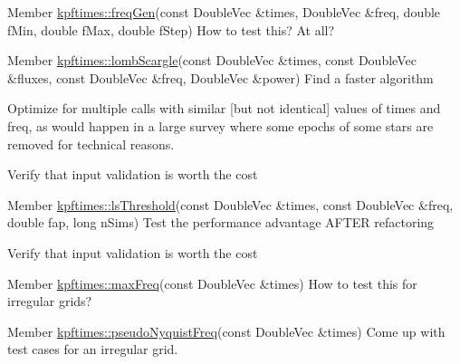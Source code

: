 \label{todo__todo000006}
\hypertarget{todo__todo000006}{}
 
\begin{DoxyDescription}
\item[Member \hyperlink{group__grid_ga5fc61b434afae334b5ec95e1ab0f7093}{kpftimes::freqGen}(const DoubleVec \&times, DoubleVec \&freq, double fMin, double fMax, double fStep) ]How to test this? At all? 
\end{DoxyDescription}

\label{todo__todo000007}
\hypertarget{todo__todo000007}{}
 
\begin{DoxyDescription}
\item[Member \hyperlink{group__period_ga2c64d467f67fa7f90f96617275e057a7}{kpftimes::lombScargle}(const DoubleVec \&times, const DoubleVec \&fluxes, const DoubleVec \&freq, DoubleVec \&power) ]Find a faster algorithm 

Optimize for multiple calls with similar \mbox{[}but not identical\mbox{]} values of times and freq, as would happen in a large survey where some epochs of some stars are removed for technical reasons. 

Verify that input validation is worth the cost 
\end{DoxyDescription}

\label{todo__todo000008}
\hypertarget{todo__todo000008}{}
 
\begin{DoxyDescription}
\item[Member \hyperlink{group__period_ga86b0f84540eab7eb0793b5ba94899d1e}{kpftimes::lsThreshold}(const DoubleVec \&times, const DoubleVec \&freq, double fap, long nSims) ]Test the performance advantage AFTER refactoring 

Verify that input validation is worth the cost 
\end{DoxyDescription}

\label{todo__todo000010}
\hypertarget{todo__todo000010}{}
 
\begin{DoxyDescription}
\item[Member \hyperlink{group__grid_gae62bc6f792fbbc2447cb85dbac341c5f}{kpftimes::maxFreq}(const DoubleVec \&times) ]How to test this for irregular grids? 
\end{DoxyDescription}

\label{todo__todo000009}
\hypertarget{todo__todo000009}{}
 
\begin{DoxyDescription}
\item[Member \hyperlink{group__util_ga4b6ecddd43b6c6caf1d0db59b4a0b613}{kpftimes::pseudoNyquistFreq}(const DoubleVec \&times) ]Come up with test cases for an irregular grid. 
\end{DoxyDescription}